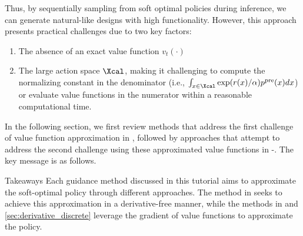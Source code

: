 Thus, by sequentially sampling from soft optimal policies during inference, we can generate natural-like designs with high functionality. However, this approach presents practical challenges due to two key factors:
\begin{enumerate}
    \item The absence of an exact value function $v_t(\cdot)$
    \item  { The large action space $\Xcal$, making it challenging to compute the normalizing constant in the denominator (i.e., $\int_{x\in \Xcal} \exp(r(x)/\alpha)p^{\pre}(x)dx$) or evaluate value functions in the numerator within a reasonable computational time. } 
\end{enumerate}
In the following section, we first review methods that address the first challenge of value function approximation in , followed by approaches that attempt to address the second challenge using these approximated value functions in -. The key message is as follows. 

\begin{AIbox}{Takeaways}
Each guidance method discussed in this tutorial aims to approximate the soft-optimal policy through different approaches. The method in  seeks to achieve this approximation in a derivative-free manner, while the methods in  and \ref{sec:derivative_discrete} leverage the gradient of value functions to approximate the policy.
\end{AIbox}

